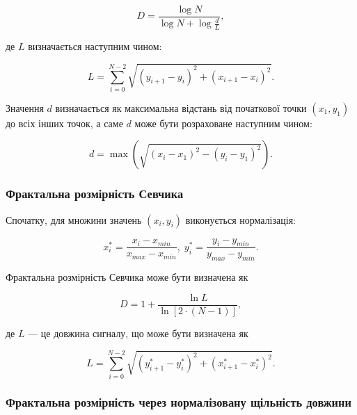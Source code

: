 \documentclass[
  letterpaper,
]{report}
\begin{document}
\[
D = \frac{\log{N}}{\log{N} + \log{\frac{d}{L}}}, 
\]

де \(L\) визначається наступним чином:

\[
L = \sum_{i=0}^{N-2}\sqrt{\left( y_{i+1}-y_{i} \right)^{2} + \left( x_{i+1}-x_{i} \right)^{2}}. 
\]

Значення \(d\) визначається як максимальна відстань від початкової точки
\(\left( x_1, y_1 \right)\) до всіх інших точок, а саме \(d\) може бути
розраховане наступним чином:

\[
d = \max{\left( \sqrt{\left( x_i - x_1 \right)^{2} - \left( y_i - y_1 \right)^{2}} \right)}.
\]

\hypertarget{ux444ux440ux430ux43aux442ux430ux43bux44cux43dux430-ux440ux43eux437ux43cux456ux440ux43dux456ux441ux442ux44c-ux441ux435ux432ux447ux438ux43aux430}{%
\subsubsection{Фрактальна розмірність
Севчика}\label{ux444ux440ux430ux43aux442ux430ux43bux44cux43dux430-ux440ux43eux437ux43cux456ux440ux43dux456ux441ux442ux44c-ux441ux435ux432ux447ux438ux43aux430}}

Спочатку, для множини значень \(\left( x_i, y_i \right)\) виконується
нормалізація:

\[
x_{i}^{*} = \frac{x_i-x_{min}}{x_{max}-x_{min}}, \; y_{i}^{*} = \frac{y_i-y_{min}}{y_{max}-y_{min}}. 
\]

Фрактальна розмірність Севчика може бути визначена як

\[
D = 1 + \frac{\ln{L}}{\ln{[2 \cdot \left( N-1 \right)]}}, 
\]

де \(L\) --- це довжина сигналу, що може бути визначена як

\[
L = \sum_{i=0}^{N-2}\sqrt{\left( y_{i+1}^{*}-y_{i}^{*} \right)^{2} + \left( x_{i+1}^{*}-x_{i}^{*} \right)^{2}}. 
\]

\hypertarget{ux444ux440ux430ux43aux442ux430ux43bux44cux43dux430-ux440ux43eux437ux43cux456ux440ux43dux456ux441ux442ux44c-ux447ux435ux440ux435ux437-ux43dux43eux440ux43cux430ux43bux456ux437ux43eux432ux430ux43dux443-ux449ux456ux43bux44cux43dux456ux441ux442ux44c-ux434ux43eux432ux436ux438ux43dux438}{%
\subsubsection{Фрактальна розмірність через нормалізовану щільність
довжини}\label{ux444ux440ux430ux43aux442ux430ux43bux44cux43dux430-ux440ux43eux437ux43cux456ux440ux43dux456ux441ux442ux44c-ux447ux435ux440ux435ux437-ux43dux43eux440ux43cux430ux43bux456ux437ux43eux432ux430ux43dux443-ux449ux456ux43bux44cux43dux456ux441ux442ux44c-ux434ux43eux432ux436ux438ux43dux438}}
\end{document}

